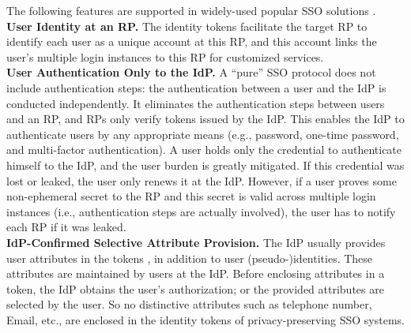 The following features are supported in widely-used popular SSO solutions \cite{NIST2017draft,OpenIDConnect,rfc6749,SAML,SAMLIdentifier}.
\\\textbf{User Identity at an RP.}
The identity tokens facilitate the target RP to identify each user as a unique account at this RP,
    and this account links the user's multiple login instances to this RP
        for customized services.
\\\textbf{User Authentication Only to the IdP.}
A ``pure'' SSO protocol  \cite{OpenIDConnect,rfc6749,SAML} does not include authentication steps:
    the authentication between a user and the IdP is conducted independently.
It eliminates the authentication steps between users and an RP,
        and RPs only verify tokens issued by the IdP.
This
    enables the IdP to authenticate users by any appropriate means (e.g., password,
one-time password, and multi-factor authentication).
A user holds only the credential to authenticate himself to the IdP,
    and the user burden is greatly mitigated.
If this credential was lost or leaked,
    the user only renews it at the IdP.
However, if a user proves some non-ephemeral secret to the RP and this secret is valid across multiple login instances
    (i.e., authentication steps are actually involved),
                the user has to notify each RP if it was leaked. %
\\\textbf{IdP-Confirmed Selective Attribute Provision.}
The IdP usually provides user attributes in the tokens \cite{OpenIDConnect,rfc6749,SAML},
    in addition to user (pseudo-)identities.
These attributes are maintained by users at the IdP.
Before enclosing attributes in a token,
    the IdP obtains the user's authorization;
    or the provided attributes are selected by the user.
So no distinctive attributes such as telephone number, Email, etc.,
        are enclosed in the identity tokens of privacy-preserving SSO systems.

%

